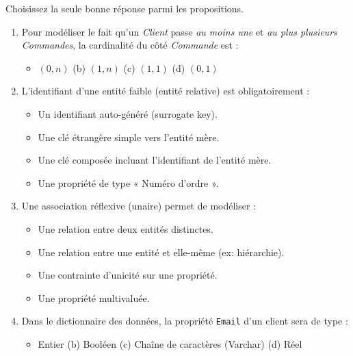 \documentclass[11pt]{article}
\begin{document}
\begin{exercice}
Choisissez la seule bonne réponse parmi les propositions.
\begin{enumerate}
    \item Pour modéliser le fait qu'un \textit{Client} passe \textit{au moins une} et \textit{au plus plusieurs} \textit{Commandes}, la cardinalité du côté \textit{Commande} est :
    \begin{itemize}
        \item[(a)] $(0, n)$ \quad (b) $(1, n)$ \quad (c) $(1, 1)$ \quad (d) $(0, 1)$
    \end{itemize}
    \item L'identifiant d'une entité faible (entité relative) est obligatoirement :
    \begin{itemize}
        \item[(a)] Un identifiant auto-généré (surrogate key).
        \item[(b)] Une clé étrangère simple vers l'entité mère.
        \item[(c)] Une clé composée incluant l'identifiant de l'entité mère.
        \item[(d)] Une propriété de type « Numéro d'ordre ».
    \end{itemize}
    \item Une association réflexive (unaire) permet de modéliser :
    \begin{itemize}
        \item[(a)] Une relation entre deux entités distinctes.
        \item[(b)] Une relation entre une entité et elle-même (ex: hiérarchie).
        \item[(c)] Une contrainte d'unicité sur une propriété.
        \item[(d)] Une propriété multivaluée.
    \end{itemize}
    \item Dans le dictionnaire des données, la propriété \texttt{Email} d'un client sera de type :
    \begin{itemize}
        \item[(a)] Entier \quad (b) Booléen \quad (c) Chaîne de caractères (Varchar) \quad (d) Réel
    \end{itemize}
\end{enumerate}
\end{exercice}
\end{document}

